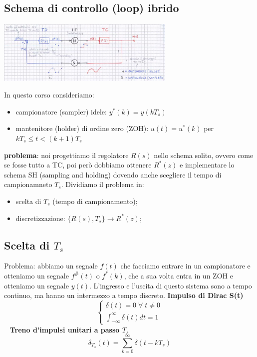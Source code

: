 \begin{landscape}
\begin{multicols*}{2}
    \subsection{Schema di controllo (loop) ibrido}
    \begin{center}
        \includegraphics[height=3cm]{../formulario/img10.JPG}
    \end{center}
    In questo corso consideriamo:
    \begin{itemize}
        \item campionatore (sampler) idele: $y^*(k) = y(k T_s)$
        \item mantenitore (holder) di ordine zero (ZOH): $u(t) = u^*(k)$ per $k T_s \leq t < (k+1)T_s$
    \end{itemize}
    \textbf{problema}: noi progettiamo il regolatore $R(s)$ nello schema solito, ovvero come se fosse tutto a TC, poi però dobbiamo ottenere $R^*(z)$ e implementare lo schema SH (sampling and holding) dovendo anche scegliere il tempo di campionamneto $T_s$.\newline
    Dividiamo il problema in:
    \begin{itemize}
        \item scelta di $T_s$ (tempo di campionamento);
        \item discretizzazione: $\{R(s), T_s\} \rightarrow  R^*(z)$;
    \end{itemize}
    \subsection{Scelta di $T_s$}
    Problema: abbiamo un segnale $f(t)$ che facciamo entrare in un campionatore e otteniamo un segnale $f^{\#}(t)$ o $f^*(k)$, che a sua volta entra in un ZOH e otteniamo un segnale $y(t)$. L'ingresso e l'uscita di questo sistema sono a tempo continuo, ma hanno un intermezzo a tempo discreto.\newline
    \newline
    \textbf{Impulso di Dirac S(t)}
    \[
        \begin{cases}
            \delta(t) = 0 \;\forall\; t \neq 0\\
            \int_{-\infty}^{\infty} \delta (t) dt = 1
        \end{cases}
    \]
    \ \newline
    \textbf{Treno d'impulsi unitari a passo $T_s$}
    \[
        \delta_{T_s} (t) = \sum_{k=0}^{\infty} \delta (t- k T_s)
    \]

\end{multicols*}
\end{landscape}
